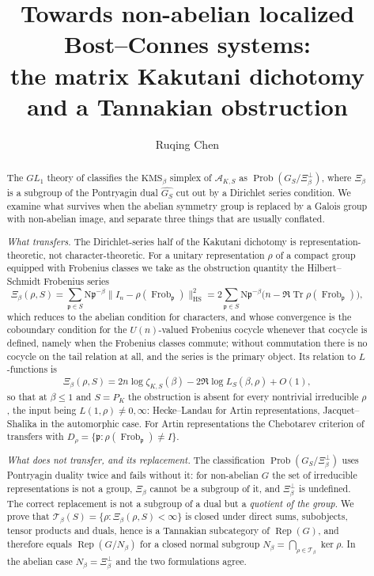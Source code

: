 \documentclass[11pt]{amsart}
\title[The non-abelian obstruction]{Towards non-abelian localized Bost--Connes systems:\\ the matrix Kakutani dichotomy and a Tannakian obstruction}
\author{Ruqing Chen}
\date{}
\numberwithin{equation}{section}
\theoremstyle{definition}
\theoremstyle{remark}
\newcommand{\cA}{\mathcal{A}}
\newcommand{\cT}{\mathcal{T}}
\newcommand{\pp}{\mathfrak{p}}
\newcommand{\Ns}{\mathrm{N}}
\newcommand{\Frob}{\operatorname{Frob}}
\newcommand{\Rep}{\operatorname{Rep}}
\newcommand{\Tr}{\operatorname{Tr}}
\newcommand{\HS}{\mathrm{HS}}
\newcommand{\Prob}{\operatorname{Prob}}
\begin{document}
\begin{abstract}
The $GL_1$ theory of \cite{Main} classifies the $\mathrm{KMS}_\beta$ simplex of
$\cA_{K,S}$ as $\Prob(G_S/\Xi_\beta^\perp)$, where $\Xi_\beta$ is a subgroup of the
Pontryagin dual $\widehat{G_S}$ cut out by a Dirichlet series condition. We examine what
survives when the abelian symmetry group is replaced by a Galois group with non-abelian
image, and separate three things that are usually conflated.

\emph{What transfers.} The Dirichlet-series half of the Kakutani dichotomy is
representation-theoretic, not character-theoretic. For a unitary representation $\rho$ of a
compact group equipped with Frobenius classes we take as the obstruction quantity the
Hilbert--Schmidt Frobenius series
\[
\Xi_\beta(\rho,S)=\sum_{\pp\in S}\Ns\pp^{-\beta}\bigl\|I_n-\rho(\Frob_\pp)\bigr\|_{\HS}^2
=2\sum_{\pp\in S}\Ns\pp^{-\beta}\bigl(n-\Re\Tr\rho(\Frob_\pp)\bigr),
\]
which reduces to the abelian condition for characters, and whose convergence is the
coboundary condition for the $U(n)$-valued Frobenius cocycle whenever that cocycle is
defined, namely when the Frobenius classes commute; without commutation there is no
cocycle on the tail relation at all, and the series is the primary object. Its relation
to $L$-functions is
\[
\Xi_\beta(\rho,S)=2n\log\zeta_{K,S}(\beta)-2\Re\log L_S(\beta,\rho)+O(1),
\]
so that at $\beta\le1$ and $S=P_K$ the obstruction is absent for every nontrivial
irreducible $\rho$, the input being $L(1,\rho)\ne0,\infty$: Hecke--Landau for Artin
representations, Jacquet--Shalika in the automorphic case. For Artin representations the
Chebotarev criterion of \cite[Thm.~3.9]{Main} transfers with
$D_\rho=\{\pp:\rho(\Frob_\pp)\ne I\}$.

\emph{What does not transfer, and its replacement.} The classification
$\Prob(G_S/\Xi_\beta^\perp)$ uses Pontryagin duality twice and fails without it: for
non-abelian $G$ the set of irreducible representations is not a group, $\Xi_\beta$ cannot be
a subgroup of it, and $\Xi_\beta^\perp$ is undefined. The correct replacement is not a
subgroup of a dual but a \emph{quotient of the group}. We prove that
$\cT_\beta(S)=\{\rho:\Xi_\beta(\rho,S)<\infty\}$ is closed under direct sums, subobjects,
tensor products and duals, hence is a Tannakian subcategory of $\Rep(G)$, and therefore
equals $\Rep(G/N_\beta)$ for a closed normal subgroup $N_\beta=\bigcap_{\rho\in\cT_\beta}\ker\rho$.
In the abelian case $N_\beta=\Xi_\beta^\perp$ and the two formulations agree.


\end{abstract}
\end{document}
